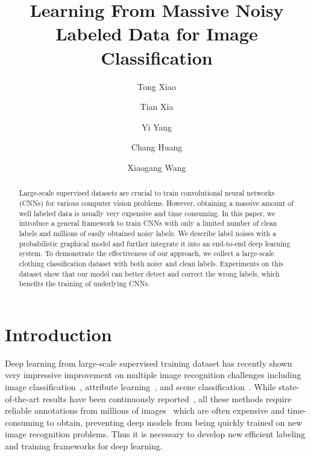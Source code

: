 \documentclass[10pt,twocolumn,letterpaper]{article}
\begin{document}
\title{Learning From Massive Noisy Labeled Data for Image Classification}
\author[1]{Tong Xiao}
\author[2]{Tian Xia}
\author[2]{Yi Yang}
\author[2]{Chang Huang}
\author[1]{Xiaogang Wang}
\renewcommand\Authands{, and }


\maketitle
\thispagestyle{empty}

\begin{abstract}
Large-scale supervised datasets are crucial to train convolutional neural networks (CNNs) for various computer vision problems. However, obtaining a massive amount of well labeled data is usually very expensive and time consuming. In this paper, we introduce a general framework to train CNNs with only a limited number of clean labels and millions of easily obtained noisy labels. We describe label noises with a probabilistic graphical model and further integrate it into an end-to-end deep learning system. To demonstrate the effectiveness of our approach, we collect a large-scale clothing classification dataset with both noisy and clean labels. Experiments on this dataset show that our model can better detect and correct the wrong labels, which benefits the training of underlying CNNs.
\end{abstract}

\section{Introduction} %
\label{sec:introduction}

Deep learning from large-scale supervised training dataset has recently shown very impressive improvement on multiple image recognition challenges including image classification~\cite{krizhevsky2012imagenet}, attribute learning~\cite{zhang2014panda}, and scene classification~\cite{farabet2013learning}. While state-of-the-art results have been continuously reported~\cite{zeiler2013visualizing,simonyan2014very,szegedy2014going}, all these methods require reliable annotations from millions of images~\cite{deng2009imagenet} which are often expensive and time-consuming to obtain, preventing deep models from being quickly trained on new image recognition problems. Thus it is necessary to develop new efficient labeling and training frameworks for deep learning.
\end{document}
